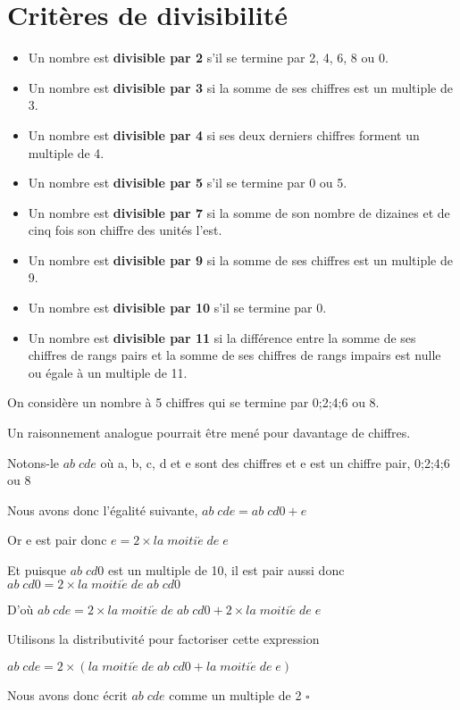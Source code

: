 \section{Critères de divisibilité}
\begin{propriete}[\admise]	
	\begin{itemize}
		\item Un nombre est \textbf{divisible par 2} s'il se termine par 2, 4, 6, 8 ou 0.
		\item Un nombre est \textbf{divisible par 3} si la somme de ses chiffres est un multiple de 3.
		\item Un nombre est \textbf{divisible par 4} si ses deux derniers chiffres forment un multiple de 4.
		\item Un nombre est \textbf{divisible par 5} s'il se termine par 0 ou 5.
		\item Un nombre est \textbf{divisible par 7} si la somme de son nombre de dizaines et de cinq fois son chiffre des unités l'est.
		\item Un nombre est \textbf{divisible par 9} si la somme de ses chiffres est un multiple de 9.
		\item Un nombre est \textbf{divisible par 10} s'il se termine par 0.
		\item Un nombre est \textbf{divisible par 11} si la différence entre la somme de ses chiffres de rangs pairs et
	la somme de ses chiffres de rangs impairs est nulle ou égale à un multiple de 11.
	\end{itemize}
\end{propriete}
\renewcommand{\StringPREUVE}{\textsc{Idée de la preuve du critère de divisibilité par 2}}
\begin{preuve}

	On considère un nombre à 5 chiffres qui se termine par 0;2;4;6 ou 8.

	Un raisonnement analogue pourrait être mené pour davantage de chiffres.
	
	Notons-le $ab\;cde$ où a, b, c, d et e sont des chiffres et e est un chiffre pair, 0;2;4;6 ou 8
	
	Nous avons donc l'égalité suivante, $ab\;cde = ab\;cd0 + e$

	Or e est pair donc $e = 2\times la\;moiti\acute{e}\;de\;e$

	Et puisque $ab\;cd0$ est un multiple de 10, il est pair aussi donc $ab\;cd0 = 2\times la\;moiti\acute{e}\;de\;ab\;cd0$	
	
	D'où $ab\;cde = 2\times la\;moiti\acute{e}\;de\;ab\;cd0 + 2\times la\;moiti\acute{e}\;de\;e$
		
	Utilisons la distributivité pour factoriser cette expression

	$ab\;cde = 2\times (la\;moiti\acute{e}\;de\;ab\;cd0 + la\;moiti\acute{e}\;de\;e)$
	
	Nous avons donc écrit $ab\;cde$ comme un multiple de 2 $\square$	
\end{preuve}
\renewcommand{\StringPREUVE}{PREUVE}

